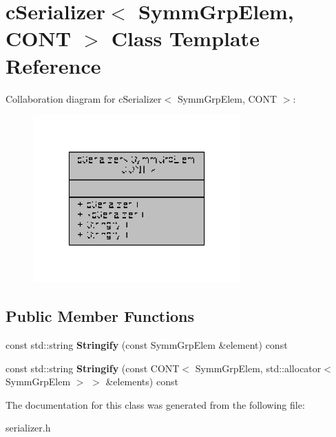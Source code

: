 \hypertarget{classcSerializer_3_01SymmGrpElem_00_01CONT_01_4}{\section{c\-Serializer$<$ Symm\-Grp\-Elem, C\-O\-N\-T $>$ Class Template Reference}
\label{classcSerializer_3_01SymmGrpElem_00_01CONT_01_4}
}


Collaboration diagram for c\-Serializer$<$ Symm\-Grp\-Elem, C\-O\-N\-T $>$\-:
\nopagebreak
\begin{figure}[H]
\begin{center}
\leavevmode
\includegraphics[width=226pt]{classcSerializer_3_01SymmGrpElem_00_01CONT_01_4__coll__graph}
\end{center}
\end{figure}
\subsection*{Public Member Functions}
\begin{DoxyCompactItemize}
\item 
\hypertarget{classcSerializer_3_01SymmGrpElem_00_01CONT_01_4_a9f2b83d7cb75cfad5bd2a1c15fa968c1}{const std\-::string {\bfseries Stringify} (const Symm\-Grp\-Elem \&element) const }\label{classcSerializer_3_01SymmGrpElem_00_01CONT_01_4_a9f2b83d7cb75cfad5bd2a1c15fa968c1}

\item 
\hypertarget{classcSerializer_3_01SymmGrpElem_00_01CONT_01_4_adc87f8732b096f7add2f18f486bada73}{const std\-::string {\bfseries Stringify} (const C\-O\-N\-T$<$ Symm\-Grp\-Elem, std\-::allocator$<$ Symm\-Grp\-Elem $>$ $>$ \&elements) const }\label{classcSerializer_3_01SymmGrpElem_00_01CONT_01_4_adc87f8732b096f7add2f18f486bada73}

\end{DoxyCompactItemize}


The documentation for this class was generated from the following file\-:\begin{DoxyCompactItemize}
\item 
serializer.\-h\end{DoxyCompactItemize}

